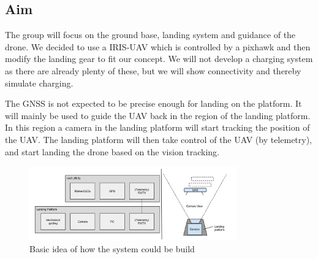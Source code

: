 \subsection{Aim}
The group will focus on the ground base, landing system and guidance of the drone. We decided to use a IRIS-UAV which is controlled by a pixhawk and then modify the landing gear to fit our concept. We will not develop a charging system as there are already plenty of these, but we will show connectivity and thereby simulate charging.
 
The GNSS is not expected to be precise enough for landing on the platform. It will mainly be used to guide the UAV back in the region of the landing platform. In this region a camera in the landing platform will start tracking the position of the UAV. The landing platform will then take control of the UAV (by telemetry), and start landing the drone based on the vision tracking.
\begin{figure}
	\centering
	\includegraphics[width=0.8\textwidth]{imgs/introduction}
	\caption{Basic idea of how the system could be build}
\end{figure}